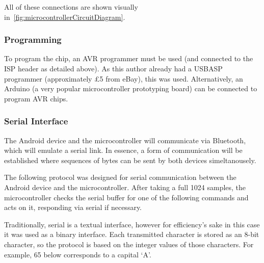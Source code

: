 All of these connections are shown visually
in~\cref{fig:microcontrollerCircuitDiagram}.

\subsubsection{Programming}

To program the chip, an AVR programmer must be used (and connected to the ISP
header as detailed above). As this author already had a USBASP programmer
(approximately \pounds 5 from eBay), this was used. Alternatively, an Arduino (a
very popular microcontroller prototyping board) can be connected to program AVR
chips.

\subsubsection{Serial Interface}

The Android device and the microcontroller will communicate via Bluetooth, which
will emulate a serial link. In essence, a form of communication will be
established where sequences of bytes can be sent by both devices simeltanousely.

The following protocol was designed for serial communication between the Android
device and the microcontroller. After taking a full 1024 samples, the
microcontroller checks the serial buffer for one of the following commands and
acts on it, responding via serial if necessary.

Traditionally, serial is a textual interface, however for efficiency's sake in
this case it was used as a binary interface. Each transmitted character is
stored as an 8-bit character, so the protocol is based on the integer values of
those characters. For example, 65 below corresponds to a capital `A'.

